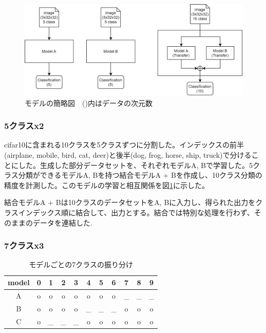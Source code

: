 \documentclass[twocolumn]{jarticle}     %
\begin{document}
\begin{figure}[t]
	\begin{center}
		\includegraphics[clip,width=16cm]{model_figure.png}
		\caption{モデルの簡略図　()内はデータの次元数}
		\label{fig:model}
	\end{center}
\end{figure}

\subsubsection{5クラスx2}

cifar10に含まれる10クラスを5クラスずつに分割した。インデックスの前半(airplane, mobile, bird, cat, deer)と後半(dog, frog, horse, ship, truck)で分けることにした。生成した部分データセットを、それぞれモデルA, Bで学習した。5クラス分類ができるモデルA, Bを持つ結合モデルA + Bを作成し、10クラス分類の精度を計測した。このモデルの学習と相互関係を図\ref{fig:model}に示した。

結合モデルA + Bは10クラスのデータセットをA, Bに入力し、得られた出力をクラスインデックス順に結合して、出力とする。結合では特別な処理を行わず、そのままのデータを連結した.

\subsubsection{7クラスx3}

\begin{table}[tb]
  \begin{center}
    \caption{モデルごとの7クラスの振り分け}
    \begin{tabular}{|c||c|c|c|c|c|c|c|c|c|c|} \hline
      model & 0 & 1 & 2 & 3 & 4 & 5 & 6 & 7 & 8 & 9 \\ \hline\hline
      A     & o & o & o & o & o & o & o & _ & _ & _ \\ \hline
      B     & o & o & o & o & _ & _ & _ & o & o & o \\ \hline
      C     & o & _ & _ & _ & o & o & o & o & o & o \\ \hline
    \end{tabular}
    \label{tab:class7}
  \end{center}
\end{table}
\end{document}
